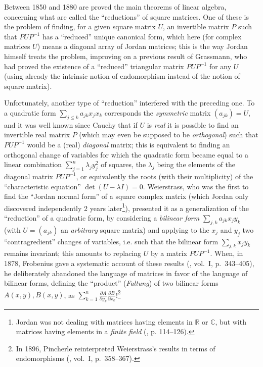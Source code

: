 \documentclass[12pt,a4paper,leqno,twoside]{extbook}
\newcommand{\C}{\mathbb{C}}
\newcommand{\R}{\mathbb{R}}
\newcommand{\pder}[2]{\frac{\partial #1}{\partial #2}}
\begin{document}
Between 1850 and 1880 are proved the main theorems of linear algebra, concerning what are called the ``reductions'' of square matrices. One of these is the problem of finding, for a given square matrix \(U\), an invertible matrix \(P\) such that \(PUP^{-1}\) has a ``reduced'' unique canonical form, which here (for complex matrices \(U\)) means a diagonal array of Jordan matrices; this is the way Jordan himself treats the problem, improving on a previous result of Grassmann, who had proved the existence of a ``reduced'' triangular matrix \(PUP^{-1}\) for any \(U\) (using already the intrinsic notion of endomorphism instead of the notion of square matrix).

Unfortunately, another type of ``reduction'' interfered with the preceding one. To a quadratic form \(\sum\limits_{j \leq k} a_{jk} x_j x_k\) corresponds the \emph{symmetric} matrix \((a_{jk}) = U\), and it was well known since Cauchy that if \(U\) is \emph{real} it is possible to find an invertible real matrix \(P\) (which may even be supposed to be \emph{orthogonal}) such that \(PUP^{-1}\) would be a (real) \emph{diagonal} matrix; this is equivalent to finding an orthogonal change of variables for which the quadratic form became equal to a linear combination \(\sum\limits_{j=1}^n \lambda_j y_j^2\) of squares, the \(\lambda_j\) being the elements of the diagonal matrix \(PUP^{-1}\), or equivalently the roots (with their multiplicity) of the ``characteristic equation'' \(\det{(U - \lambda I)} = 0\). Weierstrass, who was the first to find the ``Jordan normal form'' of a square complex matrix (which Jordan only discovered independently 2 years later\footnote{Jordan was not dealing with matrices having elements in \(\R\) or \(\C\), but with matrices having elements in a \emph{finite field} (\cite{123}, p. 114--126).}), presented it as a generalization of the ``reduction'' of a quadratic form, by considering a \emph{bilinear form} \(\sum\limits_{j,k} a_{jk} x_j y_k\) (with \(U = (a_{jk})\) an \emph{arbitrary} square matrix) and applying to the \(x_j\) and \(y_j\) two ``contragredient'' changes of variables, i.e. such that the bilinear form \(\sum\limits_{j,k} x_j y_k\) remains invariant; this amounts to replacing \(U\) by a matrix \(PUP^{-1}\). When, in 1878, Frobenius gave a systematic account of these results (\cite{078}, vol.~I, p.~343--405), he deliberately abandoned the language of matrices in favor of the language of bilinear forms, defining the ``product'' (\emph{Faltung}) of two bilinear forms \(A(x,y), B(x,y)\), as \(\sum\limits_{k=1}^n \pder{A}{y_k} \pder{B}{x_k}\)!\footnote{In 1896, Pincherle reinterpreted Weierstrass's results in terms of endomorphisms (\cite{173}, vol.~I, p.~358--367).}
\end{document}
